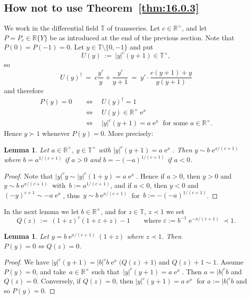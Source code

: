 \documentclass[]{amsart}
\numberwithin{equation}{section}
\newcommand{\bbold}{\mathbb}
\def\R { {\bbold R} }
\def\T { {\bbold T} }
\def \ex{\operatorname{e}}
\newtheorem{lemma}[theorem]{Lemma}
\theoremstyle{definition}
\theoremstyle{remark}
\newcommand{\abs}[1]{\lvert#1\rvert}
\begin{document}
\subsection*{How not to use Theorem~\ref{thm:16.0.3}}
We  work in the differential field $\T$ of transseries. Let $c\in\R^>$, and let $P=P_c\in\R\{Y\}$ be as introduced at the end
of the previous section. Note that $P(0)=P(-1)=0$. Let $y\in\T\setminus\{0,-1\}$ and put 
$$U(y)\ :=\ \abs{y}^{c}(y+1)\in \T^\times,$$
so
$$U(y)^\dagger\  =\   c\frac{y'}{y}+\frac{y'}{y+1}\  =\  y'\cdot \frac{c(y+1)+y}{y(y+1)}$$
and therefore 
\begin{align*}
P(y)=0 &\quad\Longleftrightarrow\quad U(y)^\dagger=1 \\ &\quad\Longleftrightarrow\quad U(y)\in \R^\times\ex^x \\
 &\quad\Longleftrightarrow\quad  \abs{y}^c(y+1) = a\ex^x \text{ for some $a\in \R^\times$.}
\end{align*}
Hence $y\succ 1$ whenever $P(y)=0$. More precisely:

\begin{lemma}\label{pyo}
Let $a\in\R^\times$, $y\in \T^\times$ with  $\abs{y}^c(y+1) = a\ex^x$. 
Then  $y \sim b \ex^{x/(c+1)}$ where $b=a^{1/(c+1)}$ if $a>0$ and $b=-(-a)^{1/(c+1)}$ if $a<0$.
\end{lemma}
\begin{proof}
Note that $\abs{y}^c y \sim \abs{y}^c(1+y) = a\ex^x$.
Hence if $a>0$, then $y>0$ and~$y\sim b\ex^{x/(c+1)}$
with~$b:=a^{1/(c+1)}$, and if $a<0$, then $y<0$ and $(-y)^{c+1}\sim -a\ex^x$,
thus~$y\sim b\ex^{x/(c+1)}$ for~$b:=-(-a)^{1/(c+1)}$.
\end{proof}

\noindent
In the next lemma we let $b\in \R^\times$, and for $z\in\T$, $z\prec 1$ we set
$$Q(z)\ :=\  (1+z)^c ( 1+\varepsilon +z)-1\qquad\text{where  $\varepsilon:=b^{-1}\ex^{-x/(c+1)}\prec 1$.}$$

\begin{lemma}
Let $y=b\ex^{x/(c+1)}(1+z)$ where $z\prec 1$. Then $P(y)=0\Longleftrightarrow Q(z)=0$.
\end{lemma}
\begin{proof}
We have $\abs{y}^c(y+1)=\abs{b}^c b\ex^x \big(Q(z)+1\big)$ and $Q(z)+1\sim 1$.
Assume $P(y)=0$, and
take~$a\in\R^\times$ such that~$\abs{y}^c(y+1)=a\ex^x$.
Then $a=\abs{b}^{c}b$ and $Q(z)=0$. Conversely, if $Q(z)=0$, then  $\abs{y}^c(y+1)=a\ex^x$ for $a:=\abs{b}^c b$ and so $P(y)=0$.
\end{proof}
\end{document}
